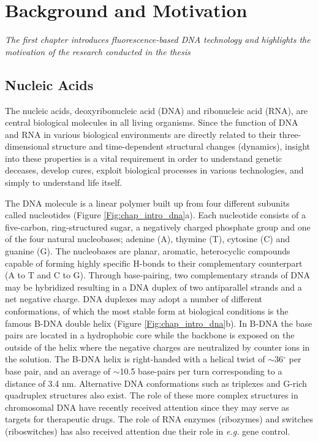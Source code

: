 \chapter{Background and Motivation}
\label{chap:Intro}
\textit{The first chapter introduces fluorescence-based DNA technology and highlights the motivation of the research conducted in the thesis}
\vfill
\minitoc
\newpage

\section{Nucleic Acids}
 The nucleic acids, deoxyribonucleic acid (DNA) and ribonucleic acid (RNA), are central biological molecules in all living organisms.\cite{Bloomfield} Since the function of DNA and RNA in various biological environments are directly related to their three-dimensional structure and time-dependent structural changes (dynamics), insight into these properties is a vital requirement in order to understand genetic deceases, develop cures, exploit biological processes in various technologies, and simply to understand life itself.

 The DNA molecule is a linear polymer built up from four different subunits called nucleotides (Figure \ref{Fig:chap_intro_dna}a). Each nucleotide consists of a five-carbon, ring-structured sugar, a negatively charged phosphate group and one of the four natural nucleobases; adenine (A), thymine (T), cytosine (C) and guanine (G). The nucleobases are planar, aromatic, heterocyclic compounds capable of forming highly specific H-bonds to their complementary counterpart (A to T and C to G). Through base-pairing, two complementary strands of DNA may be hybridized resulting in a DNA duplex of two antiparallel strands and a net negative charge. DNA duplexes may adopt a number of different conformations, of which the most stable form at biological conditions is the famous B-DNA double helix (Figure \ref{Fig:chap_intro_dna}b).\cite{Watson1953} In B-DNA the base pairs are located in a hydrophobic core while the backbone is exposed on the outside of the helix where the negative charges are neutralized by counter ions in the solution. The B-DNA helix is right-handed with a helical twist of $\sim$36$^\circ$ per base pair, and an average of $\sim$10.5 base-pairs per turn corresponding to a distance of 3.4 nm. Alternative DNA conformations such as triplexes \cite{Felsenfeld1957,Duca2008} and G-rich quadruplex structures \cite{Davis2007} also exist. The role of these more complex structures in chromosomal DNA have recently received attention since they may serve as targets for therapeutic drugs.\cite{Jain2008,Chin2007,Besch2004,Huppert2008,Qin2008,Chen2008} The role of RNA enzymes (ribozymes) and switches (riboswitches) has also received attention due their role in \emph{e.g.} gene control.\cite{Serganov2007}


